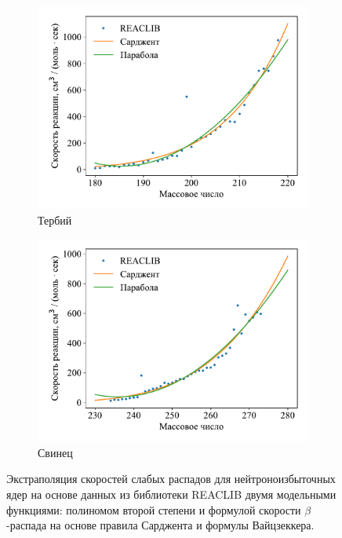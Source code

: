 \begin{figure}
  \centering
  \begin{subfigure}{0.48\textwidth}
    \centering
    \includegraphics[width=\textwidth]{pics/decay_fit65.pdf}
    \caption{Тербий}
  \end{subfigure}
  \hfill
  \begin{subfigure}{0.48\textwidth}
    \centering
    \includegraphics[width=\textwidth]{pics/decay_fit82.pdf}
    \caption{Свинец}
  \end{subfigure}
  \caption{Экстраполяция скоростей слабых распадов для нейтроноизбыточных ядер на основе данных из библиотеки REACLIB двумя модельными функциями: полиномом второй степени и формулой скорости $\beta$-распада на основе правила Сарджента и формулы Вайцзеккера.}
  \label{img:weak_decay_fit}
\end{figure}

